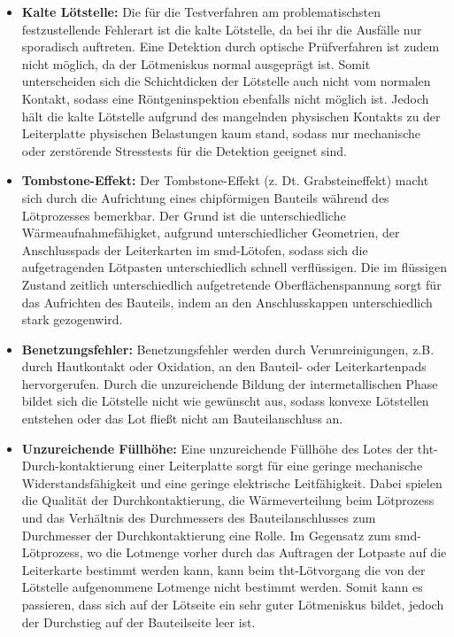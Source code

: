         \begin{itemize}
            \item \textbf{Kalte Lötstelle:} Die für die Testverfahren am problematischsten festzustellende Fehlerart ist die kalte Lötstelle, da bei ihr die Ausfälle nur sporadisch auftreten. Eine Detektion durch optische Prüfverfahren ist zudem nicht möglich, da der Lötmeniskus normal ausgeprägt ist. Somit unterscheiden sich die Schichtdicken der Lötstelle auch nicht vom normalen Kontakt, sodass eine Röntgeninspektion ebenfalls nicht möglich ist. Jedoch hält die kalte Lötstelle aufgrund des mangelnden physischen Kontakts zu der Leiterplatte physischen Belastungen kaum stand, sodass nur mechanische oder zerstörende Stresstests für die Detektion geeignet sind. \cite{berger_test-_2012}
            \item \textbf{Tombstone-Effekt:} Der Tombstone-Effekt (z. Dt. Grabsteineffekt) macht sich durch die Aufrichtung eines chipförmigen Bauteils während des Lötprozesses bemerkbar. Der Grund ist die unterschiedliche Wärmeaufnahmefähigket, aufgrund unterschiedlicher Geometrien, der Anschlusspads der Leiterkarten im \ac{smd}-Lötofen, sodass sich die aufgetragenden Lötpasten unterschiedlich schnell verflüssigen. Die im flüssigen Zustand zeitlich unterschiedlich aufgetretende Oberflächenspannung sorgt für das Aufrichten des Bauteils, indem an den Anschlusskappen unterschiedlich stark \glqq gezogen\grqq\@ wird. \cite{berger_test-_2012}
            \item \textbf{Benetzungsfehler:} Benetzungsfehler werden durch Verunreinigungen, z.B. durch Hautkontakt oder Oxidation, an den Bauteil- oder Leiterkartenpads hervorgerufen. Durch die unzureichende Bildung der intermetallischen Phase bildet sich die Lötstelle nicht wie gewünscht aus, sodass konvexe Lötstellen entstehen oder das Lot fließt nicht am Bauteilanschluss an. \cite{berger_test-_2012}
            \item \textbf{Unzureichende Füllhöhe:} Eine unzureichende Füllhöhe des Lotes der \ac{tht}-Durch-kontaktierung einer Leiterplatte sorgt für eine geringe mechanische Widerstandsfähigkeit und eine geringe elektrische Leitfähigkeit. Dabei spielen die Qualität der Durchkontaktierung, die Wärmeverteilung beim Lötprozess und das Verhältnis des Durchmessers des Bauteilanschlusses zum Durchmesser der Durchkontaktierung eine Rolle. Im Gegensatz zum \ac{smd}-Lötprozess, wo die Lotmenge vorher durch das Auftragen der Lotpaste auf die Leiterkarte bestimmt werden kann, kann beim \ac{tht}-Lötvorgang die von der Lötstelle aufgenommene Lotmenge nicht bestimmt werden. Somit kann es passieren, dass sich auf der Lötseite ein sehr guter Lötmeniskus bildet, jedoch der Durchstieg auf der Bauteilseite leer ist. \cite{berger_test-_2012}

\end{itemize}
